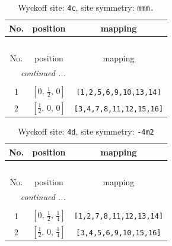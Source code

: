 \documentclass[fleqn,8pt]{jsarticle}
\begin{document}
\begin{longtable}{ccc}
\caption{Wyckoff site: {\tt 4c}, site symmetry: {\tt mmm.}}
 \\
 \hline \hline
No. & position & mapping \\ \hline \endfirsthead

\multicolumn{2}{l}{\tablename\ \thetable{}} \\
 \hline \hline
No. & position & mapping \\ \hline \endhead

 \hline \hline
\multicolumn{2}{r}{\footnotesize\it continued ...} \\ \endfoot

 \hline \hline
\multicolumn{2}{r}{} \\ \endlastfoot

1 & $\left[ 0,\, \frac{1}{2},\, 0 \right]$ & {\tt [1,2,5,6,9,10,13,14]} \\ \hline
2 & $\left[ \frac{1}{2},\, 0,\, 0 \right]$ & {\tt [3,4,7,8,11,12,15,16]} \\
\end{longtable}
\renewcommand{\arraystretch}{1.2}
\begin{longtable}{ccc}
\caption{Wyckoff site: {\tt 4d}, site symmetry: {\tt -4m2}}
 \\
 \hline \hline
No. & position & mapping \\ \hline \endfirsthead

\multicolumn{2}{l}{\tablename\ \thetable{}} \\
 \hline \hline
No. & position & mapping \\ \hline \endhead

 \hline \hline
\multicolumn{2}{r}{\footnotesize\it continued ...} \\ \endfoot

 \hline \hline
\multicolumn{2}{r}{} \\ \endlastfoot

1 & $\left[ 0,\, \frac{1}{2},\, \frac{1}{4} \right]$ & {\tt [1,2,7,8,11,12,13,14]} \\ \hline
2 & $\left[ \frac{1}{2},\, 0,\, \frac{1}{4} \right]$ & {\tt [3,4,5,6,9,10,15,16]} \\
\end{longtable}
\renewcommand{\arraystretch}{1.2}
\end{document}

